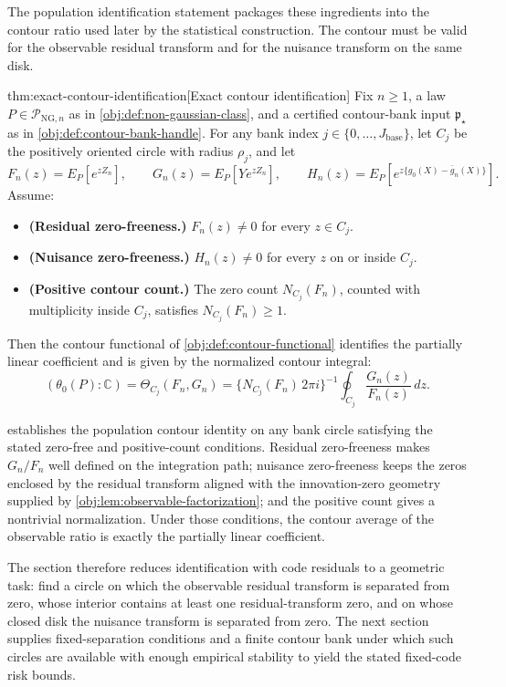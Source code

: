 The population identification statement packages these ingredients into the contour ratio used later by the statistical construction. The contour must be valid for the observable residual transform and for the nuisance transform on the same disk.

\begin{theoremv}{thm:exact-contour-identification}[Exact contour identification]
Fix \(n\ge 1\), a law \(P\in\mathcal P_{\mathrm{NG},n}\) as in \cref{obj:def:non-gaussian-class}, and a certified contour-bank input \(\mathfrak p_{\star}\) as in \cref{obj:def:contour-bank-handle}. For any bank index \(j\in\{0,\ldots,J_{\mathrm{base}}\}\), let \(C_j\) be the positively oriented circle with radius \(\rho_j\), and let
\[
F_n(z)=E_P[e^{zZ_n}],\qquad
G_n(z)=E_P[Ye^{zZ_n}],\qquad
H_n(z)=E_P[e^{z\{g_0(X)-\bar g_n(X)\}}].
\]
Assume:
\begin{itemize}
\item \textbf{(Residual zero-freeness.)} \(F_n(z)\ne 0\) for every \(z\in C_j\).
\item \textbf{(Nuisance zero-freeness.)} \(H_n(z)\ne 0\) for every \(z\) on or inside \(C_j\).
\item \textbf{(Positive contour count.)} The zero count \(N_{C_j}(F_n)\), counted with multiplicity inside \(C_j\), satisfies \(N_{C_j}(F_n)\ge 1\).
\end{itemize}
Then the contour functional of \cref{obj:def:contour-functional} identifies the partially linear coefficient and is given by the normalized contour integral:
\[
(\theta_0(P):\mathbb C)
=
\Theta_{C_j}(F_n,G_n)
=
\{N_{C_j}(F_n)\,2\pi i\}^{-1}
\oint_{C_j}\frac{G_n(z)}{F_n(z)}\,dz .
\]
\end{theoremv}

 establishes the population contour identity on any bank circle satisfying the stated zero-free and positive-count conditions. Residual zero-freeness makes \(G_n/F_n\) well defined on the integration path; nuisance zero-freeness keeps the zeros enclosed by the residual transform aligned with the innovation-zero geometry supplied by \cref{obj:lem:observable-factorization}; and the positive count gives a nontrivial normalization. Under those conditions, the contour average of the observable ratio is exactly the partially linear coefficient.

The section therefore reduces identification with code residuals to a geometric task: find a circle on which the observable residual transform is separated from zero, whose interior contains at least one residual-transform zero, and on whose closed disk the nuisance transform is separated from zero. The next section supplies fixed-separation conditions and a finite contour bank under which such circles are available with enough empirical stability to yield the stated fixed-code risk bounds.
